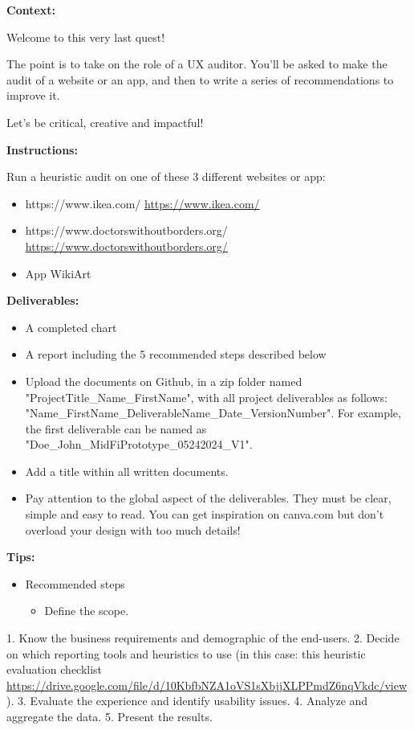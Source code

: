 \makeheaderfiles

\textbf{Context:}

Welcome to this very last quest!

The point is to take on the role of a UX auditor. You'll be asked to make the audit of a website or an app, and then to write a series of recommendations to improve it.

Let's be critical, creative and impactful!

\textbf{Instructions:}

Run a heuristic audit on one of these 3 different websites or app:

\begin{itemize}
\item https://www.ikea.com/ \url{https://www.ikea.com/}
\item https://www.doctorswithoutborders.org/ \url{https://www.doctorswithoutborders.org/}
\item App WikiArt
\end{itemize}

\textbf{Deliverables:}

\begin{itemize}
\item A completed chart
\item A report including the 5 recommended steps described below
\item Upload the documents on Github, in a zip folder named "ProjectTitle\_Name\_FirstName", with all project deliverables as follows: "Name\_FirstName\_DeliverableName\_Date\_VersionNumber".  For example, the first deliverable can be named as "Doe\_John\_MidFiPrototype\_05242024\_V1".
\item Add a title within all written documents.
\item Pay attention to the global aspect of the deliverables. They must be clear, simple and easy to read. You can get inspiration on canva.com but don't overload your design with too much details!
\end{itemize}

\textbf{Tips:}

\begin{itemize}
\item Recommended steps
\begin{itemize}
\item Define the scope.
\end{itemize}
\end{itemize}
1. Know the business requirements and demographic of the end-users.
2. Decide on which reporting tools and heuristics to use (in this case: this heuristic evaluation checklist \url{https://drive.google.com/file/d/10KbfbNZA1oVS1sXbjjXLPPmdZ6nqVkdc/view}).
3. Evaluate the experience and identify usability issues.
4. Analyze and aggregate the data.
5. Present the results.


